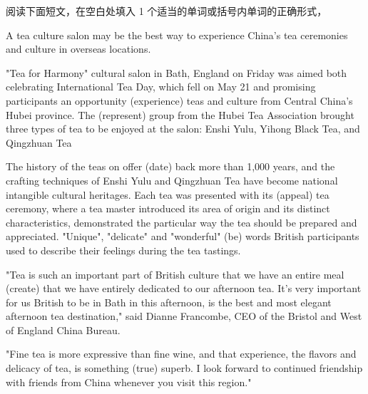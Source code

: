 \documentclass{英语试卷}
\begin{document}
\par 阅读下面短文，在空白处填入 1 个适当的单词或括号内单词的正确形式，\par
\par A tea culture salon may be the best way to experience China's tea ceremonies and culture in overseas locations.\par
\par "Tea for Harmony" cultural salon in Bath, England on Friday was aimed  both celebrating International Tea Day, which fell on May 21 and promising participants an opportunity  (experience) teas and culture from Central China's Hubei province. The  (represent) group from the Hubei Tea Association brought three types of tea to be enjoyed at the salon: Enshi Yulu, Yihong Black Tea, and Qingzhuan Tea\par
\par The history of the teas on offer  (date) back more than 1,000 years, and the crafting techniques of Enshi Yulu and Qingzhuan Tea have become national intangible cultural heritages. Each tea was presented with its  (appeal) tea ceremony, where a tea master introduced its area of origin and its distinct characteristics,  demonstrated the particular way the tea should be prepared and appreciated. "Unique", "delicate" and "wonderful"  (be) words British participants used to describe their feelings during the tea tastings.\par
\par "Tea is such an important part of British culture that we have an entire meal  (create) that we have entirely dedicated to our afternoon tea. It's very important for us British to be in Bath in this afternoon,  is the best and most elegant afternoon tea destination," said Dianne Francombe, CEO of the Bristol and West of England China Bureau.\par
\par "Fine tea is more expressive than fine wine, and that experience, the flavors and delicacy of tea, is something  (true) superb. I look forward to continued friendship with friends from China whenever you visit this region."\par
\end{document}
